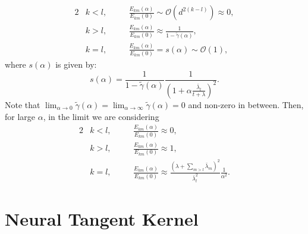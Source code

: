 \documentclass{article}
\begin{document}
%
\begin{alignat}{2}
 &k < l,\quad &&\frac{E_{km}(\alpha)}{E_{km}(0)} \sim \mathcal{O}(d^{2(k-l)})\approx 0, \nonumber\\
 &k > l,\quad &&\frac{E_{km}(\alpha)}{E_{km}(0)} \approx \frac{1}{1-\tilde\gamma(\alpha)},\nonumber\\
 &k = l,\quad &&\frac{E_{km}(\alpha)}{E_{km}(0)} = s(\alpha)\sim\mathcal{O}(1),
 \end{alignat}
 where $s(\alpha)$ is given by:
 \begin{equation}
     s(\alpha) = \frac{1}{1-\tilde\gamma(\alpha)}\frac{1}{\left(1+\alpha\frac{ \bar\lambda_l}{t+\lambda}\right)^2}.
\end{equation}
 Note that $\lim_{\alpha\rightarrow 0}\tilde\gamma(\alpha) = \lim_{\alpha\rightarrow \infty}\tilde\gamma(\alpha) = 0$ and non-zero in between. Then, for large $\alpha$, in the limit we are considering
 \begin{alignat}{2}
 &k < l,\quad &&\frac{E_{km}(\alpha)}{E_{km}(0)} \approx 0, \nonumber\\
 &k > l,\quad &&\frac{E_{km}(\alpha)}{E_{km}(0)} \approx 1,\nonumber\\
 &k = l,\quad &&\frac{E_{km}(\alpha)}{E_{km}(0)} \approx \frac{(\lambda+\sum_{m > l}\bar\lambda_m)^2}{\bar\lambda_l^2}\frac 1{\alpha^2}.
 \end{alignat}
 
 
 






\section{Neural Tangent Kernel}\label{SINeuralTangent}
\end{document}
